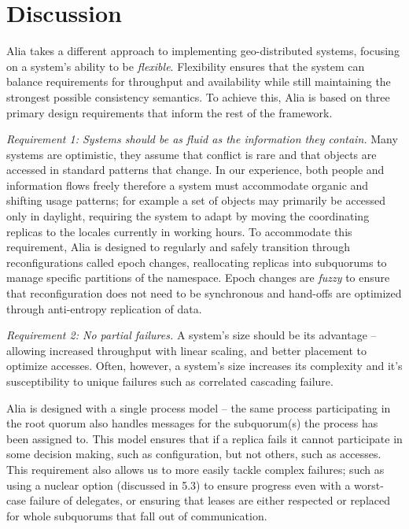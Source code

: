 \documentclass[10pt,conference]{IEEEtran}
\begin{document}
\section{Discussion}
\label{section:discussion}

Alia takes a different approach to implementing geo-distributed systems, focusing
on a system's ability to be \emph{flexible}.
Flexibility ensures that the system can balance requirements for throughput and
availability while still maintaining the strongest possible consistency semantics.
To achieve this, Alia is based on three primary design requirements that inform the
rest of the framework.

\emph{Requirement 1: Systems should be as fluid as the information they contain.}
Many systems are optimistic, they assume that conflict is rare and that objects are
accessed in standard patterns that change.
In our experience, both people and information flows freely therefore a system must
accommodate organic and shifting usage patterns; for example a set of objects may
primarily be accessed only in daylight, requiring the system to adapt by moving the
coordinating replicas to the locales currently in working hours.
To accommodate this requirement, Alia is designed to regularly and safely transition
through reconfigurations called epoch changes, reallocating replicas into subquorums
to manage specific partitions of the namespace.
Epoch changes are \emph{fuzzy} to ensure that reconfiguration does not need to be
synchronous and hand-offs are optimized through anti-entropy replication of data.

\emph{Requirement 2: No partial failures.}
A system's size should be its advantage -- allowing increased throughput with linear
scaling, and better placement to optimize accesses.
Often, however, a system's size increases its complexity and it's susceptibility
to unique failures such as correlated cascading failure.

Alia is designed with a single process model -- the same process participating in
the root quorum also handles messages for the subquorum(s) the process has been
assigned to.
This model ensures that if a replica fails it cannot participate in some decision
making, such as configuration, but not others, such as accesses.
This requirement also allows us to more easily tackle complex failures; such as
using a nuclear option (discussed in 5.3) to ensure progress even with a worst-case
failure of delegates, or ensuring that leases are either respected or replaced
for whole subquorums that fall out of communication.
\end{document}
